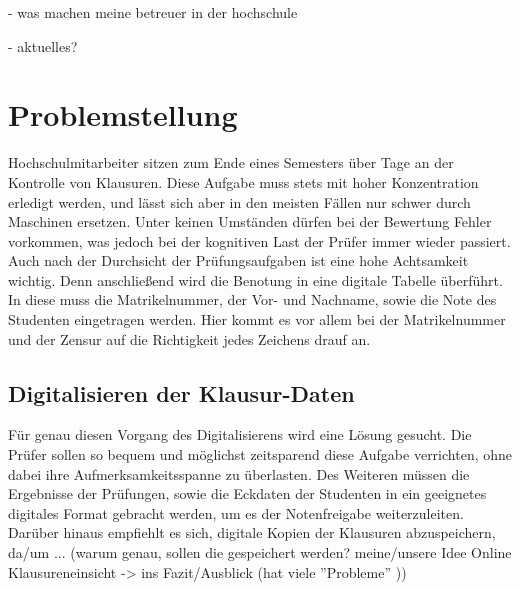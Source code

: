 \documentclass[nomenclature, 150]{HSMW-Thesis}
\begin{document}
	- was machen meine betreuer in der hochschule
	
	- aktuelles?
	


\chapter{Problemstellung} 
	Hochschulmitarbeiter sitzen zum Ende eines Semesters über Tage an der Kontrolle von Klausuren. Diese Aufgabe muss stets mit hoher Konzentration erledigt werden, und lässt sich aber in den meisten Fällen nur schwer durch Maschinen ersetzen. Unter keinen Umständen dürfen bei der Bewertung Fehler vorkommen, was jedoch bei der kognitiven Last der Prüfer immer wieder passiert. Auch nach der Durchsicht der Prüfungsaufgaben ist eine hohe Achtsamkeit wichtig. Denn anschließend wird die Benotung in eine digitale Tabelle überführt. In diese muss die Matrikelnummer, der Vor- und Nachname, sowie die Note des Studenten eingetragen werden. Hier kommt es vor allem bei der Matrikelnummer und der Zensur auf die Richtigkeit jedes Zeichens drauf an. 
	
	\section{Digitalisieren der Klausur-Daten}
	Für genau diesen Vorgang des Digitalisierens wird eine Lösung gesucht. Die Prüfer sollen so bequem und möglichst zeitsparend diese Aufgabe verrichten, ohne dabei ihre Aufmerksamkeitsspanne zu überlasten. Des Weiteren müssen die Ergebnisse der Prüfungen, sowie die Eckdaten der Studenten in ein geeignetes digitales Format gebracht werden, um es der Notenfreigabe weiterzuleiten. Darüber hinaus empfiehlt es sich, digitale Kopien der Klausuren abzuspeichern, da/um ... (warum genau, sollen die gespeichert werden? meine/unsere Idee Online Klausureneinsicht -> ins Fazit/Ausblick (hat viele ''Probleme'' ))
	
\end{document}
